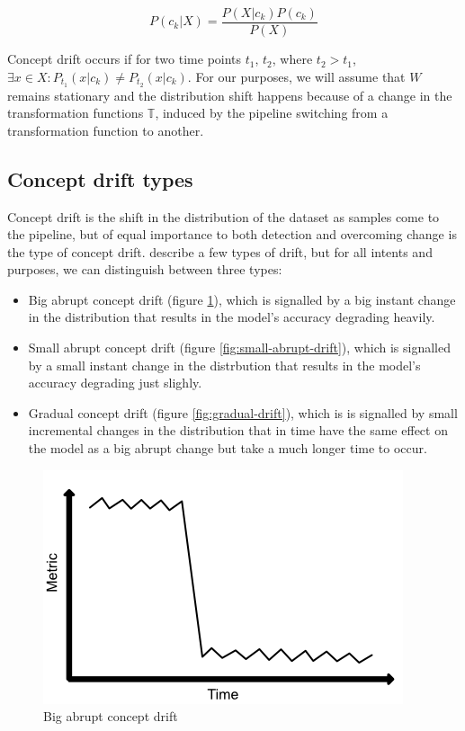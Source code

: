 \documentclass[12pt]{extreport}
\begin{document}
\begin{equation}
    P(c_k|X) = \frac{P(X|c_k) P(c_k)}{P(X)}
\end{equation}

Concept drift occurs if for two time points $t_1$, $t_2$, where $t_2 > t_1$, $\exists x \in X: P_{t_1}(x|c_k) \neq P_{t_2}(x|c_k)$. For our purposes, we will assume that $W$ remains stationary and the distribution shift happens because of a change in the transformation functions $\mathbb{T}$, induced by the pipeline switching from a transformation function to another.

\subsection{Concept drift types}

Concept drift is the shift in the distribution of the dataset as samples come to the pipeline, but of equal importance to both detection and overcoming change is the type of concept drift. \cite{survey-concept-drift} describe a few types of drift, but for all intents and purposes, we can distinguish between three types:

\begin{itemize}
    \item Big abrupt concept drift (figure \ref{fig:big-abrupt-drift}), which is signalled by a big instant change in the distribution that results in the model's accuracy degrading heavily.
    \item Small abrupt concept drift (figure \ref{fig:small-abrupt-drift}), which is signalled by a small instant change in the distrbution that results in the model's accuracy degrading just slighly.
    \item Gradual concept drift (figure \ref{fig:gradual-drift}), which is is signalled by small incremental changes in the distribution that in time have the same effect on the model as a big abrupt change but take a much longer time to occur.
\end{itemize}

\begin{figure}[ht!]
\centering
\includegraphics[width=0.6\linewidth]{assets/preliminaries/big-abrupt-drift.png}
\caption{Big abrupt concept drift}
\label{fig:big-abrupt-drift}
\end{figure}
\end{document}
